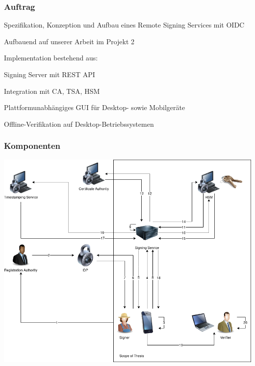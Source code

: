 \documentclass[12pt,xcolor=pdftex,dvipsnames,table]{beamer}
\newcommand{\Subitem}[1]{
{\setlength\itemindent{15pt} \item[-] #1}
}
\begin{document}
\begin{frame}
\begin{columns}[T]
\begin{column}{0.5\textwidth}
            \end{column}
        \end{columns}
    \end{frame}

    \begin{frame}
        \frametitle{Auftrag}
        \begin{itemize}
            \item Spezifikation, Konzeption und Aufbau eines Remote Signing Services mit OIDC
            \item Aufbauend auf unserer Arbeit im Projekt 2
            \item Implementation bestehend aus:
            \Subitem{Signing Server mit REST API}
            \Subitem{Integration mit CA, TSA, HSM}
            \Subitem{Plattformunabhängiges GUI für Desktop- sowie Mobilgeräte}
            \Subitem{Offline-Verifikation auf Desktop-Betriebssystemen}
        \end{itemize}
    \end{frame}

    \begin{frame}
        \frametitle{Komponenten}
        \includegraphics[width=\textwidth]{images/BigPicture.png}
    \end{frame}
\end{document}
